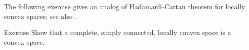 The following exercise gives an analog of Hadamard--Cartan theorem for locally convex spaces;
see also \cite{a-b:h-c}.

\begin{thm}{Exercise}\label{ex:Hadamard--Cartan}
Show that a complete, simply connected, locally convex space is a convex space.
\end{thm}













